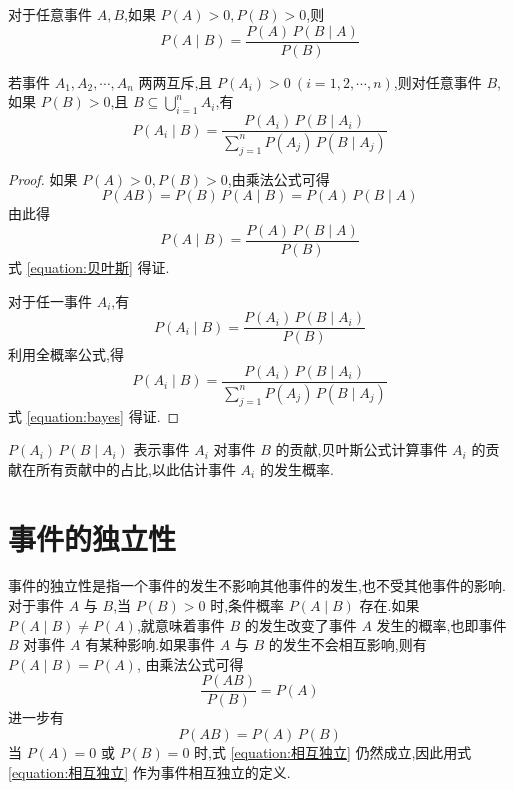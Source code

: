 \begin{theorem}[][贝叶斯公式]
    \indent 对于任意事件 $A,B$,如果 $P(A)>0, P(B)>0$,则
    \begin{equation} \label{equation:贝叶斯}
        P(A \mid B)=\dfrac{P(A) \, P(B \mid A)}{P(B)}
    \end{equation}

    若事件 $A_1,A_2,\cdots,A_n$ 两两互斥,且 $P(A_i)>0 \ (i=1,2,\cdots,n)$,则对任意事件 $B$,如果 $P(B)>0$,且 $B \subseteq \displaystyle\bigcup_{i=1}^n A_i$,有
    \begin{equation} \label{equation:bayes}
        P(A_i \mid B) = \dfrac{P(A_i) \, P(B \mid A_i)}{\displaystyle\sum_{j=1}^n P(A_j) \, P(B \mid A_j)}
    \end{equation}
\end{theorem}

\begin{proof}
    如果 $P(A)>0, P(B)>0$,由乘法公式可得
    $$
    P(AB) = P(B) \, P(A \mid B) = P(A) \, P(B \mid A)
    $$
    由此得
    $$
    P(A \mid B)=\dfrac{P(A) \, P(B \mid A)}{P(B)}
    $$
    式 \eqref{equation:贝叶斯} 得证.

    对于任一事件 $A_i$,有
    $$
    P(A_i \mid B)=\dfrac{P(A_i) \, P(B \mid A_i)}{P(B)}
    $$
    利用全概率公式,得
    $$
    P(A_i \mid B) = \dfrac{P(A_i) \, P(B \mid A_i)}{\displaystyle\sum_{j=1}^n P(A_j) \, P(B \mid A_j)}
    $$
    式 \eqref{equation:bayes} 得证.
\end{proof}

\begin{note}
    \indent $P(A_i) \, P(B \mid A_i)$ 表示事件 $A_i$ 对事件 $B$ 的贡献,贝叶斯公式计算事件 $A_i$ 的贡献在所有贡献中的占比,以此估计事件 $A_i$ 的发生概率.
\end{note}

\section{事件的独立性}

事件的独立性是指一个事件的发生不影响其他事件的发生,也不受其他事件的影响.对于事件 $A$ 与 $B$,当 $P(B) > 0$ 时,条件概率 $P(A \mid B)$ 存在.如果 $P(A \mid B) \not= P(A)$,就意味着事件 $B$ 的发生改变了事件 $A$ 发生的概率,也即事件 $B$ 对事件 $A$ 有某种影响.如果事件 $A$ 与 $B$ 的发生不会相互影响,则有 $P(A \mid B) = P(A)$, 由乘法公式可得
$$
\dfrac{P(AB)}{P(B)} = P(A)
$$
进一步有
\begin{equation} \label{equation:相互独立}
    P(AB) = P(A) \, P(B)
\end{equation}
当 $P(A)=0$ 或 $P(B)=0$ 时,式 \eqref{equation:相互独立} 仍然成立,因此用式 \eqref{equation:相互独立} 作为事件相互独立的定义.

